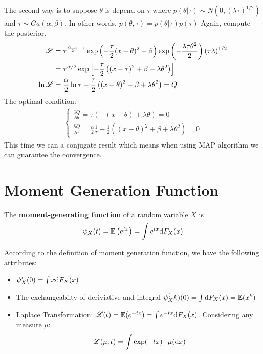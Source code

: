 	The second way is to suppose $\theta$ is depend on $\tau$  where $p(\theta| \tau)\sim N\left(0, (\lambda\tau)^{1/2}\right)$ and $\tau\sim Ga(\alpha, \beta)$. In other words,  $p(\theta,\tau) = p(\theta|\tau)p(\tau)$
	Again, compute the posterior.
	\begin{align*}
		\mathscr{L} &= \tau^{\frac{\alpha+1}{2}-1}\exp\left(-\frac{\tau}{2}(x-\theta)^2+\beta\right)\exp\left(-\frac{\lambda\tau\theta^2}{2}\right)(\tau\lambda)^{1/2}\\
		&=\tau^{\alpha/2}\exp\left[-\frac{\tau}{2}\left((x-\tau)^2+\beta+\lambda\theta^2\right)\right]\\
		\ln \mathscr{L} &= \frac{\alpha}{2}\ln\tau - \frac{\tau}{2}\left((x-\theta)^2+\beta+\lambda\theta^2\right)=Q
	\end{align*}
	The optimal condition:
	\begin{eqnarray}
		\left\{
		\begin{array}{ll}
			\frac{\partial Q}{\partial \theta} = \tau\left(-(x-\theta)+\lambda\theta\right) = 0\\
			\frac{\partial Q}{\partial \tau} = \frac{\alpha}{2}\frac{1}{\tau} - \frac{1}{2}\left((x-\theta)^2+\beta+\lambda\theta^2\right)=0
		\end{array}
		\right.
	\end{eqnarray}
	This time we can a conjugate result which means when using MAP algorithm we can guarantee the convergence.
	
	
\section{Moment Generation Function}
	\begin{definition}
		The \textbf{moment-generating function} of a random variable $X$ is 
		$$\psi_X(t)=\mathbb{E}\left(e^{tx}\right) = \int e^{tx}\mathrm{d} F_X(x)$$
	\end{definition}
	
	According to the definition of moment generation function, we have the following attributes:
	\begin{itemize}
		\item $\psi_X'(0)=\int x\mathrm{d} F_X(x)$
		\item The exchangeabilty of deriviative and integral $\psi_X^(k)(0) = \int \mathrm{d} F_X(x) = \mathbb{E} (x^k)$
		\item Laplace Transformation: $\mathscr{L}(t) = \mathbb{E}(e^{-tx})=\int e^{-tx}\mathrm{d} F_X(x)$. 
			Considering any measure $\mu$:
			$$\mathscr{L}(\mu, t) = \int \exp(-tx)\cdot\mu (\mathrm{d} x)$$
	\end{itemize}

